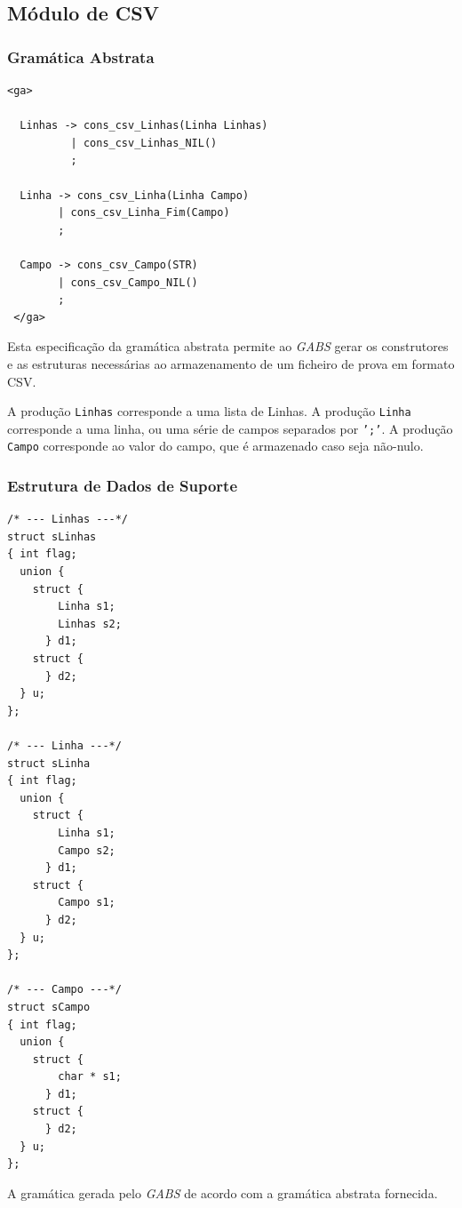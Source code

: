 \documentclass[11pt, a4paper, oneside]{article}
\begin{document}
\newpage
\subsection{Módulo de CSV}
\subsubsection{Gramática Abstrata}
\begin{lstlisting}[language={}, caption={Gramática abstrata utilizada pelo \emph{GABS}.}]
<ga>
  
  Linhas -> cons_csv_Linhas(Linha Linhas)
          | cons_csv_Linhas_NIL()
          ;

  Linha -> cons_csv_Linha(Linha Campo)
        | cons_csv_Linha_Fim(Campo)
        ;

  Campo -> cons_csv_Campo(STR)
        | cons_csv_Campo_NIL()
        ;
 </ga>
\end{lstlisting}

Esta especificação da gramática abstrata permite ao \emph{GABS} gerar os construtores e as estruturas necessárias ao armazenamento de um ficheiro de prova em formato CSV.

A produção \texttt{Linhas} corresponde a uma lista de Linhas. A produção \texttt{Linha} corresponde a uma linha, ou uma série de campos separados por \texttt{';'}. A produção \texttt{Campo} corresponde ao valor do campo, que é armazenado caso seja não-nulo.

\newpage
\subsubsection{Estrutura de Dados de Suporte}
\begin{lstlisting}[language={}, caption={Estrutura de dados para armazenar as provas.}]
/* --- Linhas ---*/
struct sLinhas 
{ int flag;
  union {  
    struct {
        Linha s1;
        Linhas s2;
      } d1;
    struct {
      } d2;
  } u;
};

/* --- Linha ---*/
struct sLinha 
{ int flag;
  union {  
    struct {
        Linha s1;
        Campo s2;
      } d1;
    struct {
        Campo s1;
      } d2;
  } u;
};

/* --- Campo ---*/
struct sCampo 
{ int flag;
  union {  
    struct {
        char * s1;
      } d1;
    struct {
      } d2;
  } u;
};
\end{lstlisting}

A gramática gerada pelo \emph{GABS} de acordo com a gramática abstrata fornecida.
\end{document}
